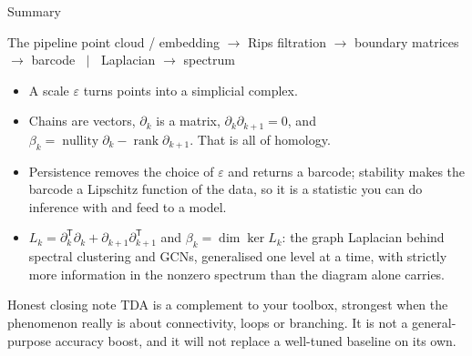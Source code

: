 \documentclass[10pt,aspectratio=169]{beamer}
\newcommand{\rank}{\operatorname{rank}}
\newcommand{\nullity}{\operatorname{nullity}}
\newcommand{\HL}[1]{\textcolor{blue!70!black}{#1}}
\begin{document}
    \begin{frame}[shrink=5]{Summary}
        \begin{block}{The pipeline}
            \centering
            point cloud / embedding $\to$ Rips filtration $\to$ boundary matrices $\to$ barcode
            $\;\;\big|\;\;$ Laplacian $\to$ spectrum
        \end{block}

        \vspace{0.5em}
        \small
        \begin{itemize}
            \item A scale $\varepsilon$ turns points into a simplicial complex.
            \item \HL{Chains are vectors, $\partial_k$ is a matrix, $\partial_k\partial_{k+1}=0$,
                and $\beta_k=\nullity\partial_k-\rank\partial_{k+1}$.} That is all of homology.
            \item Persistence removes the choice of $\varepsilon$ and returns a barcode;
            stability makes the barcode a Lipschitz function of the data, so it is a
            statistic you can do inference with and feed to a model.
            \item \HL{$L_k=\partial_k^{\mathsf T}\partial_k+\partial_{k+1}\partial_{k+1}^{\mathsf T}$
                and $\beta_k=\dim\ker L_k$}: the graph Laplacian behind spectral clustering
            and GCNs, generalised one level at a time, with strictly more information in
            the nonzero spectrum than the diagram alone carries.
        \end{itemize}

        \vspace{0.4em}

        \begin{alertblock}{Honest closing note}
            TDA is a complement to your toolbox, strongest when the phenomenon really is about
            connectivity, loops or branching. It is not a general-purpose accuracy boost, and it
            will not replace a well-tuned baseline on its own.
        \end{alertblock}
    \end{frame}
\end{document}
